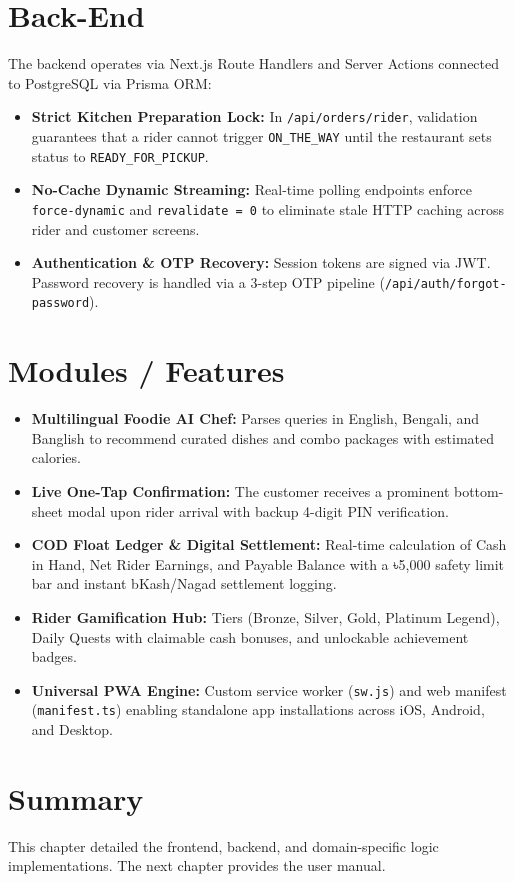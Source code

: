 \documentclass[12pt,a4paper]{report}
\begin{document}
\section{Back-End}
The backend operates via Next.js Route Handlers and Server Actions connected to PostgreSQL via Prisma ORM:
\begin{itemize}
    \item \textbf{Strict Kitchen Preparation Lock:} In \texttt{/api/orders/rider}, validation guarantees that a rider cannot trigger \texttt{ON\_THE\_WAY} until the restaurant sets status to \texttt{READY\_FOR\_PICKUP}.
    \item \textbf{No-Cache Dynamic Streaming:} Real-time polling endpoints enforce \texttt{force-dynamic} and \texttt{revalidate = 0} to eliminate stale HTTP caching across rider and customer screens.
    \item \textbf{Authentication \& OTP Recovery:} Session tokens are signed via JWT. Password recovery is handled via a 3-step OTP pipeline (\texttt{/api/auth/forgot-password}).
\end{itemize}

\section{Modules / Features}
\begin{itemize}
    \item \textbf{Multilingual Foodie AI Chef:} Parses queries in English, Bengali, and Banglish to recommend curated dishes and combo packages with estimated calories.
    \item \textbf{Live One-Tap Confirmation:} The customer receives a prominent bottom-sheet modal upon rider arrival with backup 4-digit PIN verification.
    \item \textbf{COD Float Ledger \& Digital Settlement:} Real-time calculation of Cash in Hand, Net Rider Earnings, and Payable Balance with a ৳5,000 safety limit bar and instant bKash/Nagad settlement logging.
    \item \textbf{Rider Gamification Hub:} Tiers (Bronze, Silver, Gold, Platinum Legend), Daily Quests with claimable cash bonuses, and unlockable achievement badges.
    \item \textbf{Universal PWA Engine:} Custom service worker (\texttt{sw.js}) and web manifest (\texttt{manifest.ts}) enabling standalone app installations across iOS, Android, and Desktop.
\end{itemize}

\section{Summary}
This chapter detailed the frontend, backend, and domain-specific logic implementations. The next chapter provides the user manual.
\end{document}
